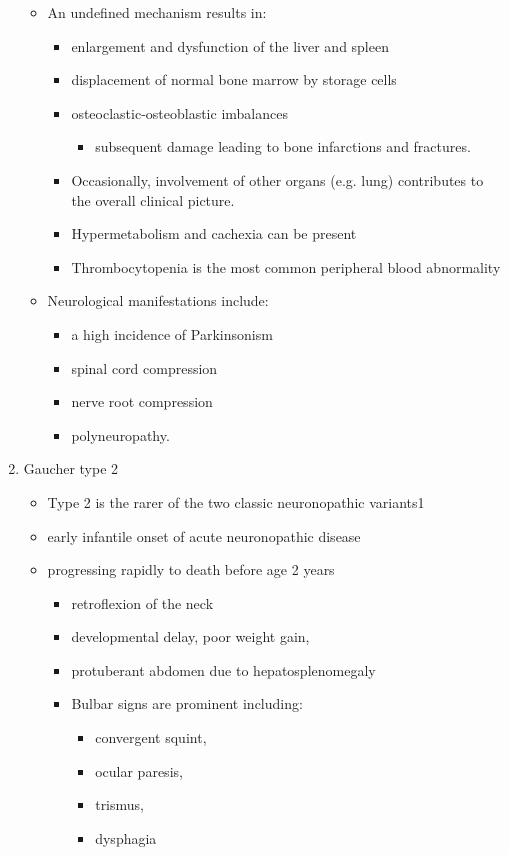 \documentclass{scrartcl}
\begin{document}
\begin{enumerate}
\begin{itemize}
\item An undefined mechanism results in:
\begin{itemize}
\item enlargement and dysfunction of the liver and spleen
\item displacement of normal bone marrow by storage cells
\item osteoclastic-osteoblastic imbalances
\begin{itemize}
\item subsequent damage leading to bone infarctions and fractures.
\end{itemize}
\item Occasionally, involvement of other organs (e.g. lung) contributes
to the overall clinical picture.
\item Hypermetabolism and cachexia can be present
\item Thrombocytopenia is the most common peripheral blood abnormality
\end{itemize}

\item Neurological manifestations include:
\begin{itemize}
\item a high incidence of Parkinsonism
\item spinal cord compression
\item nerve root compression
\item polyneuropathy.
\end{itemize}
\end{itemize}

\item Gaucher type 2
\label{sec:org0acc085}
\begin{itemize}
\item Type 2 is the rarer of the two classic neuronopathic variants1
\item early infantile onset of acute neuronopathic disease
\item progressing rapidly to death before age 2 years

\begin{itemize}
\item retroflexion of the neck
\item developmental delay, poor weight gain,
\item protuberant abdomen due to hepatosplenomegaly
\item Bulbar signs are prominent including:
\begin{itemize}
\item convergent squint,
\item ocular paresis,
\item trismus,
\item dysphagia
\end{itemize}
\end{itemize}


\end{itemize}
\end{enumerate}
\end{document}
